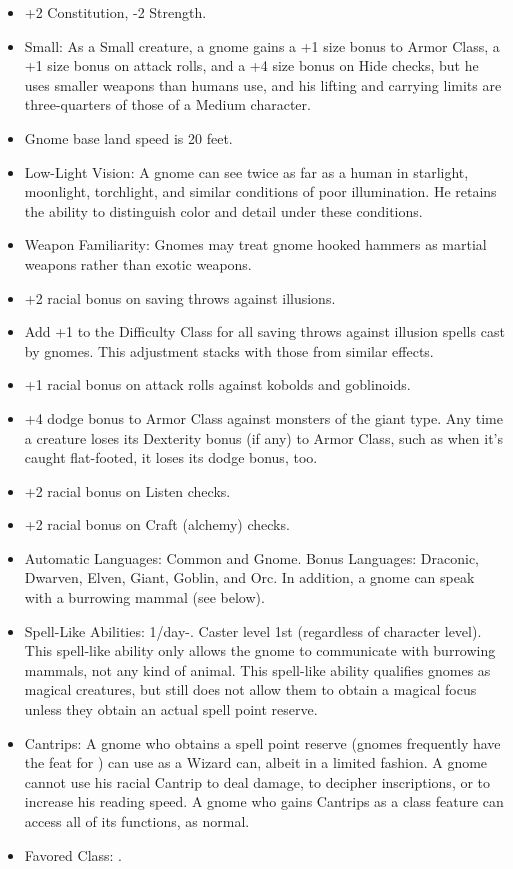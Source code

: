 \begin{itemize}
 \item +2 Constitution, -2 Strength.
 \item Small: As a Small creature, a gnome gains a +1 size bonus to Armor Class, a +1 size bonus on attack rolls, and a +4 size bonus on Hide checks, but he uses smaller weapons than humans use, and his lifting and carrying limits are three-quarters of those of a Medium character.
 \item Gnome base land speed is 20 feet.
 \item Low-Light Vision: A gnome can see twice as far as a human in starlight, moonlight, torchlight, and similar conditions of poor illumination. He retains the ability to distinguish color and detail under these conditions.
 \item Weapon Familiarity: Gnomes may treat gnome hooked hammers as martial weapons rather than exotic weapons.
 \item +2 racial bonus on saving throws against illusions.
 \item Add +1 to the Difficulty Class for all saving throws against illusion spells cast by gnomes. This adjustment stacks with those from similar effects.
 \item +1 racial bonus on attack rolls against kobolds and goblinoids.
 \item +4 dodge bonus to Armor Class against monsters of the giant type. Any time a creature loses its Dexterity bonus (if any) to Armor Class, such as when it's caught flat-footed, it loses its dodge bonus, too.
 \item +2 racial bonus on Listen checks.
 \item +2 racial bonus on Craft (alchemy) checks.
 \item Automatic Languages: Common and Gnome. Bonus Languages: Draconic, Dwarven, Elven, Giant, Goblin, and Orc. In addition, a gnome can speak with a burrowing mammal (see below).
 \item Spell-Like Abilities: 1/day-. Caster level 1st (regardless of character level). This spell-like ability only allows the gnome to communicate with burrowing mammals, not any kind of animal. This spell-like ability qualifies gnomes as magical creatures, but still does not allow them to obtain a magical focus unless they obtain an actual spell point reserve.
 \item Cantrips: A gnome who obtains a spell point reserve (gnomes frequently have the  feat for ) can use  as a Wizard can, albeit in a limited fashion. A gnome cannot use his racial Cantrip to deal damage, to decipher inscriptions, or to increase his reading speed. A gnome who gains Cantrips as a class feature can access all of its functions, as normal.
 \item Favored Class: .
\end{itemize}
